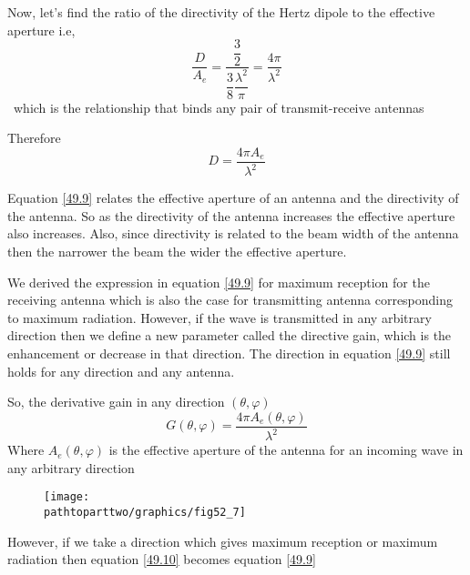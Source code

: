 Now, let's find the ratio  of the directivity of the Hertz dipole to the effective aperture i.e,
$$\dfrac{D}{A_{e}}=\dfrac{\dfrac{3}{2}}{\dfrac{3}{8}\dfrac{\lambda^{2}}{\pi}}= \dfrac{4\pi}{\lambda^{2}}$$ \ which is the relationship that binds any pair of transmit-receive antennas

Therefore
\begin{equation}
\label{49.9}
D=\dfrac{4\pi A_{e}}{\lambda^{2}}
\end{equation}

Equation \ref{49.9} relates the effective aperture of an antenna and the directivity of the antenna. So as the directivity of the antenna increases the effective aperture also increases. Also, since directivity is related to the beam width of the antenna then the narrower the beam the wider the effective aperture.

We derived the expression in equation \ref{49.9} for maximum reception for the receiving antenna which is also the case for transmitting antenna corresponding to maximum radiation. However, if the wave is transmitted in any arbitrary direction then we define a new parameter called the directive gain, which is the enhancement or decrease in that direction. The direction in equation \ref{49.9} still holds for any direction and any antenna.

So, the derivative gain in any direction $(\theta, \varphi)$ 
\begin{equation}
\label{49.10}
G(\theta, \varphi)=\dfrac{4 \pi A_{e}(\theta, \varphi)}{\lambda^{2}}
\end{equation}
Where $A_{e}(\theta, \varphi)$ is the effective aperture of the antenna for an incoming wave in any arbitrary direction
\begin{figure}[h]
\centering
\texttt{[image: \\pathtoparttwo/graphics/fig52\_7]}
\caption{}
\label{fig 1}	
\end{figure}

However, if we take a direction which gives maximum reception or maximum radiation then equation \ref{49.10} becomes equation \ref{49.9}

